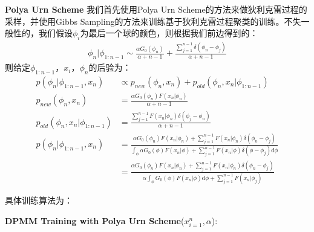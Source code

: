 \textbf{Polya Urn Scheme}
我们首先使用Polya Urn Scheme的方法来做狄利克雷过程的采样，并使用Gibbs Sampling的方法来训练基于狄利克雷过程聚类的训练。不失一般性的，我们假设$\phi_i$为最后一个球的颜色，则根据我们前边得到的：
\begin{displaymath}
\begin{split}
\phi_n | \phi_{1:n-1} \sim \frac{\alpha G_0(\phi_n)}{\alpha+n-1} + \frac{\sum_{j=1}^{n-1} \delta(\phi_n-\phi_j) }{\alpha+n-1}
\end{split}
\end{displaymath}
则给定$\phi_{1:n-1}，x_i$，$\phi_n$的后验为：
\begin{displaymath}
\begin{split}
p(\phi_n | \phi_{1:n-1}, x_n) &\propto p_{new}(\phi_n, x_n) + p_{old}(\phi_n, x_n|\phi_{1:n-1})\\
p_{new}(\phi_n, x_n) &= \frac{\alpha G_0(\phi_n)F(x_n|\phi_n)}{\alpha + n-1}\\
p_{old}(\phi_n, x_n|\phi_{1:n-1}) &= \frac{ \sum_{j=1}^{n-1}F(x_n|\phi_n) \delta(\phi_j - \phi_n)}{\alpha + n-1} \\
p(\phi_n | \phi_{1:n-1}, x_n) &= \frac{\alpha G_0(\phi_n)F(x_n|\phi_n) + \sum_{j=1}^{n-1}F(x_n|\phi_n) \delta(\phi_n - \phi_j)} {
\int_{\phi}
\alpha G_0(\phi)F(x_n|\phi) + \sum_{j=1}^{n-1}F(x_n|\phi) \delta(\phi - \phi_j)
\mathrm{d} \phi
}\\
&= \frac{\alpha G_0(\phi_n)F(x_n|\phi_n) + \sum_{j=1}^{n-1}F(x_n|\phi_n) \delta(\phi_n - \phi_j)} {
\alpha \int_{\phi} G_0(\phi)F(x_n|\phi) \mathrm{d} \phi + \sum_{j=1}^{n-1}F(x_n|\phi_j)
}
\end{split}
\end{displaymath}

具体训练算法为：

\begin{minipage}{0.8\textwidth}\centering
\begin{algorithm}[H]
\textbf{DPMM Training with Polya Urn Scheme}($x_{i=1}^{n}, \alpha$):\\

\end{algorithm}
\end{minipage}



